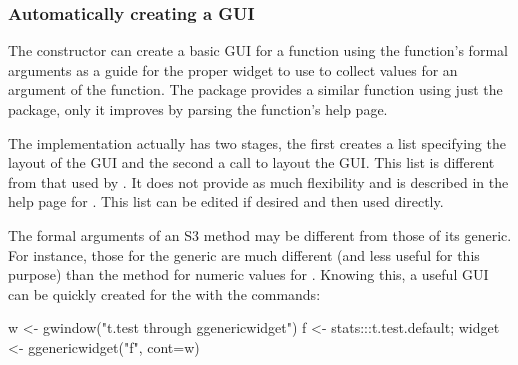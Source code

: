 \subsubsection{Automatically creating a GUI}
\label{sec:gWidgets-autom-creat-gui}

The  constructor can create a basic GUI
for a function using the function's formal arguments as a guide for
the proper widget to use to collect values for an argument of the
function. The  package provides a similar function using
just the  package, only it improves  by
parsing the function's help page.

The implementation actually has two stages, the first creates a list
specifying the layout of the GUI and the second a call to layout the
GUI. This list is different from that used by . It
does not provide as much flexibility and is described in the help page
for . This list can be edited if desired and then
used directly.

The formal arguments of an S3 method may be different from those of
its generic. For instance, those for the  generic are
much different (and less useful for this purpose) than the
 method for numeric values for . Knowing
this, a useful GUI can be quickly created for the  with
the commands:
\begin{Schunk}
\begin{Sinput}
 w <- gwindow("t.test through ggenericwidget")
 f <- stats:::t.test.default; 
 widget <- ggenericwidget("f", cont=w)
\end{Sinput}
\end{Schunk}










